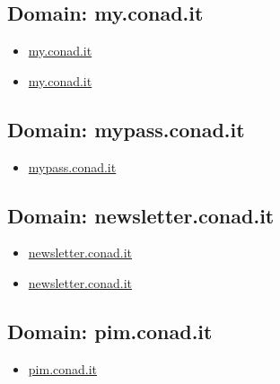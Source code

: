 \documentclass{article}
\begin{document}
    \subsection{Domain: my.conad.it}
    \begin{itemize}
        
            
            \item \href{ https://my.conad.it/login}{ my.conad.it }
            
            \item \href{ https://my.conad.it/login.html?cb=https:/vincinatale.conad.it}{ my.conad.it }
            
        
    \end{itemize}

    \subsection{Domain: mypass.conad.it}
    \begin{itemize}
        
            
            \item \href{ https://mypass.conad.it/mypass/}{ mypass.conad.it }
            
        
    \end{itemize}

    \subsection{Domain: newsletter.conad.it}
    \begin{itemize}
        
            
            \item \href{ https://www.newsletter.conad.it/}{ newsletter.conad.it }
            
            \item \href{ https://newsletter.conad.it/}{ newsletter.conad.it }
            
        
    \end{itemize}

    \subsection{Domain: pim.conad.it}
    \begin{itemize}
        
            
            \item \href{ https://pim.conad.it/}{ pim.conad.it }
            
        
    \end{itemize}
\end{document}

